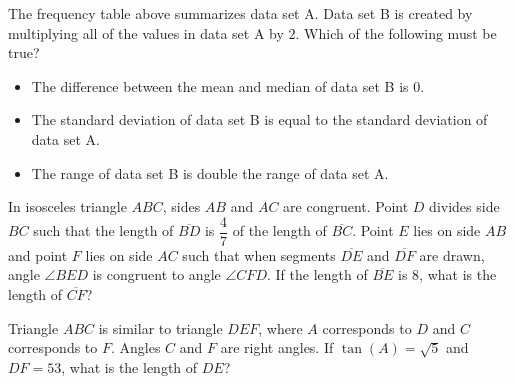 The frequency table above summarizes data set A. 
Data set B is created by multiplying all of the values in data set A by $2$. 
Which of the following must be true?

\begin{itemize}
\item[I.] The difference between the mean and median of data set B is $0$.
\item[II.] The standard deviation of data set B is equal to the standard deviation of data set A.
\item[III.] The range of data set B is double the range of data set A.
\end{itemize}

\vspace{0.75em}

\newpage

\newpage

\noindent\markforreview
\vspace{1em}
\vspace{1em}

In isosceles triangle $ABC$, sides $AB$ and $AC$ are congruent. Point $D$ divides side $BC$ such that the length of $\overline{BD}$ is $\dfrac{4}{7}$ of the length of $\overline{BC}$. Point $E$ lies on side $AB$ and point $F$ lies on side $AC$ such that when segments $\overline{DE}$ and $\overline{DF}$ are drawn, angle $\angle BED$ is congruent to angle $\angle CFD$. If the length of $\overline{BE}$ is $8$, what is the length of $\overline{CF}$?

\vspace{0.75em}


\vspace{2em}
\newpage

\newpage

\noindent\markforreview
\vspace{1em}
\vspace{1em}

Triangle $ABC$ is similar to triangle $DEF$, where $A$ corresponds to $D$ and $C$ corresponds to $F$.  
Angles $C$ and $F$ are right angles.  
If $\tan(A) = \sqrt{5}$ and $DF = 53$, what is the length of $DE$?

\vspace{0.75em}


\vspace{2em}
\newpage
